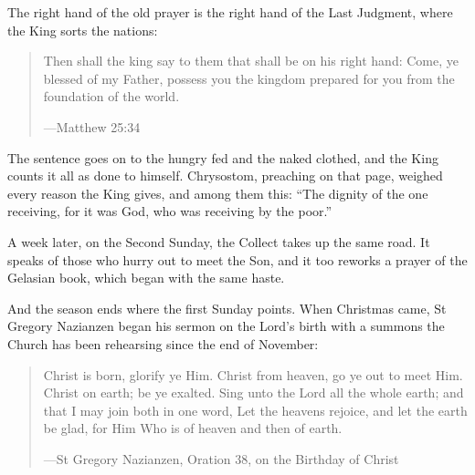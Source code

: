 The right hand of the old prayer is the right hand of the Last Judgment, where
the King sorts the nations:

\begin{quote}
Then shall the king say to them that shall be on his right hand: Come, ye
blessed of my Father, possess you the kingdom prepared for you from the
foundation of the world.\par
{\smallskip\noindent\small ---Matthew 25:34\par}
\end{quote}

\noindent The sentence goes on to the hungry fed and the naked clothed, and the
King counts it all as done to himself. Chrysostom, preaching on that page,
weighed every reason the King gives, and among them this: ``The dignity of the
one receiving, for it was God, who was receiving by the poor.''

A week later, on the Second Sunday, the Collect takes up the same road. It
speaks of those who hurry out to meet the Son, and it too reworks a prayer of
the Gelasian book, which began with the same haste.

And the season ends where the first Sunday points. When Christmas came, St
Gregory Nazianzen began his sermon on the Lord's birth with
a summons the Church has been rehearsing since the end of November:

\begin{quote}
Christ is born, glorify ye Him. Christ from heaven, go ye out to meet Him.
Christ on earth; be ye exalted. Sing unto the Lord all the whole earth; and
that I may join both in one word, Let the heavens rejoice, and let the earth be
glad, for Him Who is of heaven and then of earth.\par
{\smallskip\noindent\small ---St Gregory Nazianzen, Oration 38, on the Birthday of Christ\par}
\end{quote}
